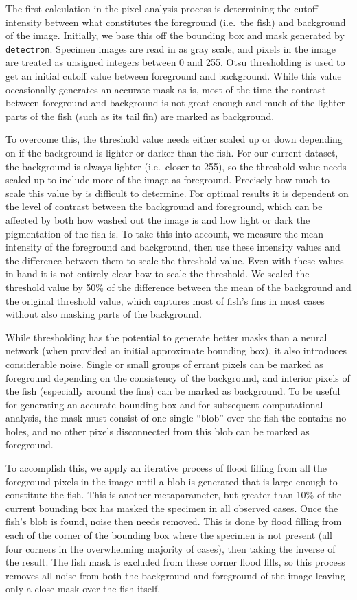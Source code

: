 \documentclass[screen,review]{acmart}
\begin{document}
The first calculation in the pixel analysis process is determining the cutoff intensity between what constitutes the foreground (i.e.\ the fish) and background of the image. Initially, we base this off the bounding box and mask generated by \verb|detectron|. Specimen images are read in as gray scale, and pixels in the image are treated as unsigned integers between 0 and 255. Otsu thresholding is used to get an initial cutoff value between foreground and background.  While this value occasionally generates an accurate mask as is, most of the time the contrast between foreground and background is not great enough and much of the lighter parts of the fish (such as its tail fin) are marked as background.

To overcome this, the threshold value needs either scaled up or down depending on if the background is lighter or darker than the fish. For our current dataset, the background is always lighter (i.e.\ closer to 255), so the threshold value needs scaled up to include more of the image as foreground. Precisely how much to scale this value by is difficult to determine. For optimal results it is dependent on the level of contrast between the background and foreground, which can be affected by both how washed out the image is and how light or dark the pigmentation of the fish is. To take this into account, we measure the mean intensity of the foreground and background, then use these intensity values and the difference between them to scale the threshold value. Even with these values in hand it is not entirely clear how to scale the threshold. We scaled the threshold value by 50\% of the difference between the mean of the background and the original threshold value, which captures most of fish's fins in most cases without also masking parts of the background.

While thresholding has the potential to generate better masks than a neural network (when provided an initial approximate bounding box), it also introduces considerable noise. Single or small groups of errant pixels can be marked as foreground depending on the consistency of the background, and interior pixels of the fish (especially around the fins) can be marked as background. To be useful for generating an accurate bounding box and for subsequent computational analysis, the mask must consist of one single ``blob'' over the fish the contains no holes, and no other pixels disconnected from this blob can be marked as foreground.

To accomplish this, we apply an iterative process of flood filling from all the foreground pixels in the image until a blob is generated that is large enough to constitute the fish. This is another metaparameter, but greater than 10\% of the current bounding box has masked the specimen in all observed cases. Once the fish's blob is found, noise then needs removed. This is done by flood filling from each of the corner of the bounding box where the specimen is not present (all four corners in the overwhelming majority of cases), then taking the inverse of the result. The fish mask is excluded from these corner flood fills, so this process removes all noise from both the background and foreground of the image leaving only a close mask over the fish itself.
\end{document}
